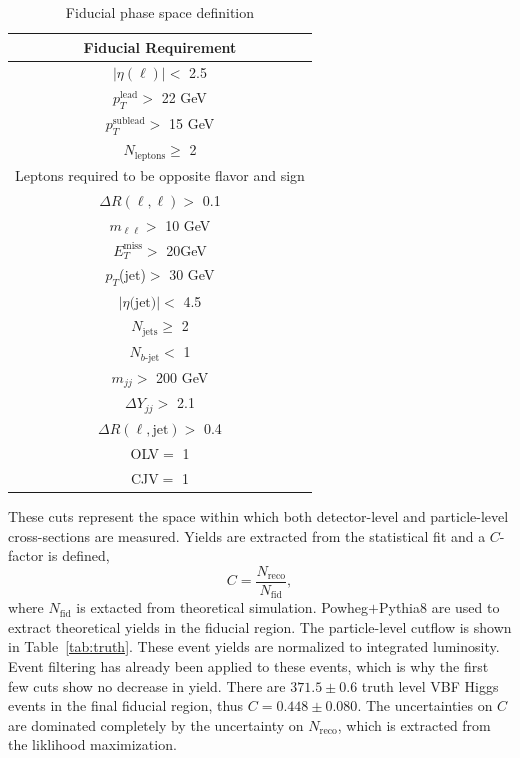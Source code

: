 \begin{table}[!ht]
\centering
\begin{tabular}{|c|}
\hline
Fiducial Requirement \\
\hline
$|\eta(\ell)|<$ 2.5 \\
$p_T^{\text{lead}}>$ 22 GeV \\
$p_T^{\text{sublead}}>$ 15 GeV \\
$N_{\text{leptons}}\geq$ 2\\
Leptons required to be opposite flavor and sign \\
$\Delta R(\ell,\ell) >$ 0.1 \\
$m_{\ell\ell}>$ 10 GeV \\
$E_T^{\text{miss}}>$ 20GeV \\
$p_T$(jet)$>$ 30 GeV \\
$|\eta\text{(jet)}|<$ 4.5\\ 
$N_{\text{jets}} \geq $ 2\\
$N_{b\text{-jet}} < $ 1\\
$m_{jj} >$ 200 GeV \\
$\Delta Y_{jj}>$ 2.1\\
$\Delta R(\ell,\text{jet})>$ 0.4\\
OLV$=$ 1 \\
CJV$=$ 1 \\
\hline
\end{tabular}
\caption{Fiducial phase space definition}
\label{tab:fiducial}
\end{table}
These cuts represent the space within which both detector-level and particle-level cross-sections are measured. Yields are extracted from the statistical fit and a $C$-factor is defined, 
\begin{equation}
C = \frac{N_\text{reco}}{N_{\text{fid}}},
\end{equation}
where $N_\text{fid}$ is extacted from theoretical simulation. Powheg$+$Pythia8 are used to extract theoretical yields in the fiducial region. The particle-level cutflow is shown in Table~\ref{tab:truth}. These event yields are normalized to integrated luminosity. Event filtering has already been applied to these events, which is why the first few cuts show no decrease in yield.  There are $371.5\pm0.6$ truth level VBF Higgs events in the final fiducial region, thus $C=0.448\pm 0.080$. The uncertainties on $C$ are dominated completely by the uncertainty on $N_{\text{reco}}$, which is extracted from the liklihood maximization.  

